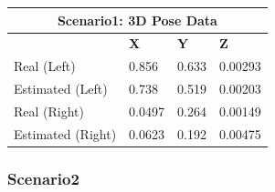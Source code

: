 \begin{table}[H]
  \centering
  \begin{tabular}{ |p{4cm}|p{2cm}|p{2cm}|p{2cm}|  }
    \hline
    \multicolumn{4}{|c|}{Scenario1: 3D Pose Data} \\
    \hline
    & \textbf{X} & \textbf{Y} & \textbf{Z} \\
    \hline
    Real (Left) & 0.856 & 0.633 & 0.00293 \\
    Estimated (Left) & 0.738 & 0.519 & 0.00203 \\
    \hline
    Real (Right) & 0.0497 & 0.264 & 0.00149 \\
    Estimated (Right) & 0.0623 & 0.192 & 0.00475 \\
    \hline
  \end{tabular}
\end{table}

\subsubsection{Scenario2}

